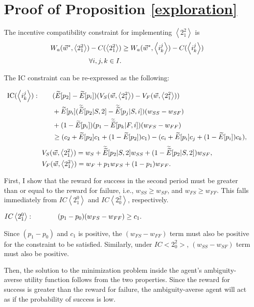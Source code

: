 \documentclass[11pt]{article} %
\theoremstyle{exampstyle}
\newcommand{\eq}[1]{\begin{align}#1\end{align}}
\newcommand{\la}{ \left < }
\newcommand{\ra}{ \right > }
\begin{document}
\newpage
\section{Proof of Proposition \ref{exploration}}
The incentive compatibility constraint for implementing $\la 2^2_1\ra$ is
\eq{
 W_a(\vec{w}^*, \la 2^2_1\ra)  - C(\la 2^2_1\ra) & \ge W_a(\vec{w}^*, \la i^j_k \ra)  - C(\la i^j_k \ra) \notag \\
 \forall i,j,k \in I. \notag
}

The IC constraint can be re-expressed as the following:

\eq{
\text{IC$(\la i^j_k \ra):$} \hspace{.3in} &(\widetilde{E}[p_2]- \widetilde{E}[p_i])(V_S(\vec{w},\la 2^2_1\ra)-V_F(\vec{w},\la 2^2_1\ra))  \notag \\
&+  \widetilde{E}[p_i] ( \widetilde{\widetilde{E}}[p_2 | S,2]- \widetilde{\widetilde{E}}[p_j | S,i]) (w_{SS}-w_{SF} ) \notag \\
&+ (1- \widetilde{E}[p_i]) (p_1- \widetilde{\widetilde{E}}[p_k | F,i]) (w_{FS}-w_{FF} )  \notag \\
& \ge (c_2+\widetilde{E}[p_2] c_1+(1-\widetilde{E}[p_2]) c_1) - (c_i + \widetilde{E}[p_i]c_j + (1-\widetilde{E}[p_i])c_k),  \notag
}
\eq{
& V_S(\vec{w},\la 2^2_1\ra)= w_S + \widetilde{\widetilde{E}}[p_2|S,2] w_{SS} + (1-\widetilde{\widetilde{E}}[p_2|S,2]) w_{SF} , \notag \\
& V_F(\vec{w},\la 2^2_1\ra)= w_F + p_1w_{FS} + (1-p_1) w_{FF}  \notag.
}

First, I show that the reward for success in the second period must be greater than or equal to the reward for failure, i.e., $w_{SS} \ge w_{SF}$, and $w_{FS} \ge w_{FF}$. This falls immediately from $IC\la 2^0_1 \ra$ and $IC \la 2^2_0 \ra $, respectively.

$IC \la 2^0_1 \ra: \hspace{.5in}  (p_1 - p_0)(w_{FS}-w_{FF}) \ge c_1.$

Since $(p_1-p_0)$ and $c_1$ is positive, the $(w_{FS}-w_{FF})$ term must also be positive for the constraint to be satisfied. Similarly, under $IC<2^2_0>$, $(w_{SS}-w_{SF})$ term must also be positive. 

Then, the solution to the minimization problem inside the agent's ambiguity-averse utility function follows from the two properties. Since the reward for success is greater than the reward for failure, the ambiguity-averse agent will act as if the probability of success is low. 
\end{document}
